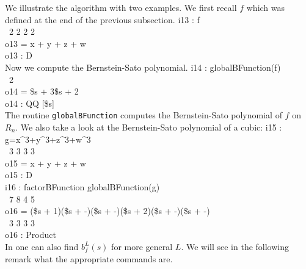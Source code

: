 We illustrate the algorithm with two examples. We first recall $f$
which was defined at the end of the previous subsection.
\beginOutput
i13 : f\\
\emptyLine
\       2    2    2    2\\
o13 = x  + y  + z  + w\\
\emptyLine
o13 : D\\
\endOutput
Now we compute the Bernstein-Sato polynomial. 
\beginOutput
i14 : globalBFunction(f)\\
\emptyLine
\        2\\
o14 = \$s  + 3\$s + 2\\
\emptyLine
o14 : QQ [\$s]\\
\endOutput
The routine {\tt globalBFunction} computes the
Bernstein-Sato polynomial of $f$ on $R_n$. We also take a look at the
Bernstein-Sato polynomial of a cubic:
\beginOutput
i15 : g=x^3+y^3+z^3+w^3\\
\emptyLine
\       3    3    3    3\\
o15 = x  + y  + z  + w\\
\emptyLine
o15 : D\\
\endOutput
\beginOutput
i16 : factorBFunction globalBFunction(g)\\
\emptyLine
\                    7       8               4       5\\
o16 = (\$s + 1)(\$s + -)(\$s + -)(\$s + 2)(\$s + -)(\$s + -)\\
\                    3       3               3       3\\
\emptyLine
o16 : Product\\
\endOutput
In \Mtwo one can also find $b^L_f(s)$ for more general $L$. We will
see in the following remark what the appropriate commands are. 
 
